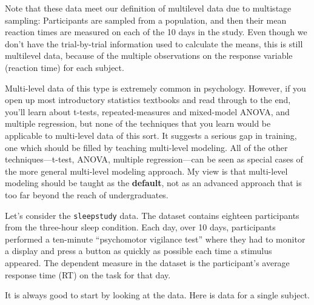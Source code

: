 \documentclass[]{book}
\newenvironment{Shaded}{\begin{snugshade}}{\end{snugshade}}
\newcommand{\DataTypeTok}[1]{\textcolor[rgb]{0.13,0.29,0.53}{#1}}
\newcommand{\DecValTok}[1]{\textcolor[rgb]{0.00,0.00,0.81}{#1}}
\newcommand{\KeywordTok}[1]{\textcolor[rgb]{0.13,0.29,0.53}{\textbf{#1}}}
\newcommand{\NormalTok}[1]{#1}
\newcommand{\OperatorTok}[1]{\textcolor[rgb]{0.81,0.36,0.00}{\textbf{#1}}}
\newcommand{\StringTok}[1]{\textcolor[rgb]{0.31,0.60,0.02}{#1}}
\begin{document}
Note that these data meet our definition of multilevel data due to multistage sampling: Participants are sampled from a population, and then their mean reaction times are measured on each of the 10 days in the study. Even though we don't have the trial-by-trial information used to calculate the means, this is still multilevel data, because of the multiple observations on the response variable (reaction time) for each subject.

Multi-level data of this type is extremely common in psychology. However, if you open up most introductory statistics textbooks and read through to the end, you'll learn about t-tests, repeated-measures and mixed-model ANOVA, and multiple regression, but none of the techniques that you learn would be applicable to multi-level data of this sort. It suggests a serious gap in training, one which should be filled by teaching multi-level modeling. All of the other techniques---t-test, ANOVA, multiple regression---can be seen as special cases of the more general multi-level modeling approach. My view is that multi-level modeling should be taught as the \textbf{default}, not as an advanced approach that is too far beyond the reach of undergraduates.

Let's consider the \texttt{sleepstudy} data. The dataset contains eighteen participants from the three-hour sleep condition. Each day, over 10 days, participants performed a ten-minute ``psychomotor vigilance test'' where they had to monitor a display and press a button as quickly as possible each time a stimulus appeared. The dependent measure in the dataset is the participant's average response time (RT) on the task for that day.

It is always good to start by looking at the data. Here is data for a single subject.

\begin{Shaded}
\end{Shaded}
\end{document}
